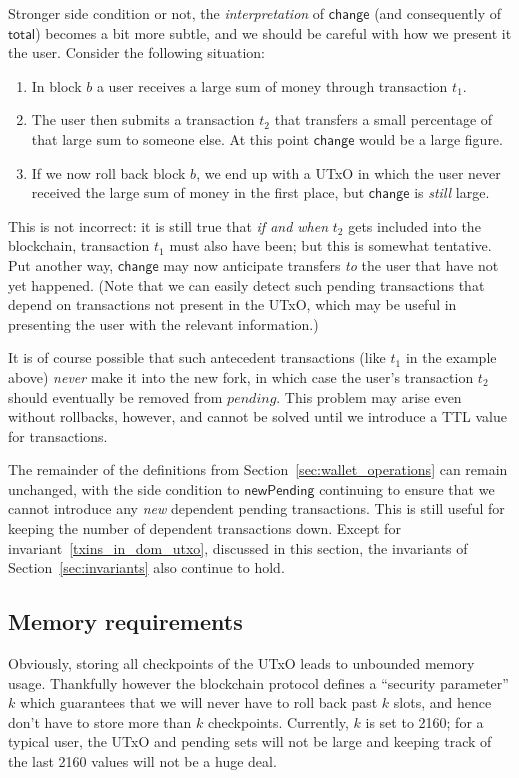 \documentclass{article}
\begin{document}
Stronger side condition or not, the \emph{interpretation} of
$\mathsf{change}$ (and consequently of $\mathsf{total}$) becomes a bit more
subtle, and we should be careful with how we present it the user. Consider the
following situation:
%
\begin{enumerate}
\item In block $b$ a user receives a large sum of money through transaction
$t_1$.
\item The user then submits a transaction $t_2$ that transfers a small
percentage of that large sum to someone else. At this point $\mathsf{change}$
would be a large figure.
\item If we now roll back block $b$, we end up with a UTxO in
which the user never received the large sum of money in the first place, but
$\mathsf{change}$ is \emph{still} large.
\end{enumerate}

This is not incorrect: it is still true that \emph{if and when} $t_2$ gets
included into the blockchain, transaction $t_1$ must also have been; but this is
somewhat tentative. Put another way, $\mathsf{change}$ may now anticipate
transfers \emph{to} the user that have not yet happened. (Note that we can
easily detect such pending transactions that depend on transactions not
present in the UTxO, which may be useful in presenting the user with the
relevant information.)

It is of course possible that such antecedent transactions (like $t_1$ in the
example above) \emph{never} make it into the new fork, in which case the user's
transaction $t_2$ should eventually be removed from $\mathit{pending}$. This
problem may arise even without rollbacks, however, and cannot be solved until we
introduce a TTL value for transactions.

The remainder of the definitions from Section~\ref{sec:wallet_operations} can
remain unchanged, with the side condition to $\mathsf{newPending}$ continuing to
ensure that we cannot introduce any \emph{new} dependent pending transactions.
This is still useful for keeping the number of dependent transactions down.
Except for invariant~\eqref{txins_in_dom_utxo}, discussed in this section, the
invariants of Section~\ref{sec:invariants} also continue to hold.

\subsection{Memory requirements}

Obviously, storing all checkpoints of the UTxO leads to unbounded memory usage.
Thankfully however the blockchain protocol defines a ``security parameter'' $k$
which guarantees that we will never have to roll back past $k$ slots, and hence
don't have to store more than $k$ checkpoints. Currently, $k$ is set to 2160;
for a typical user, the UTxO and pending sets will not be large and keeping
track of the last 2160 values will not be a huge deal.
\end{document}

